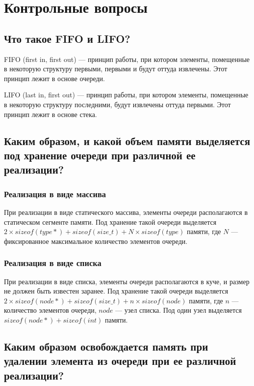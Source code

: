 \documentclass[a4paper,12pt]{extarticle}
\begin{document}
\newpage


\section{Контрольные вопросы}
\subsection{Что такое FIFO и LIFO?}

FIFO (first in, first out) --- принцип работы, при котором элементы, помещенные в некоторую структуру первыми, первыми и будут оттуда извлечены. Этот принцип лежит в основе очереди.

LIFO (last in, first out) --- принцип работы, при котором элементы, помещенные в некоторую структуру последними, будут извлечены оттуда первыми. Этот принцип лежит в основе стека.

\subsection{Каким образом, и какой объем памяти выделяется под хранение очереди при различной ее реализации?}

\subsubsection{Реализация в виде массива}
При реализации в виде статического массива, элементы очереди располагаются в статическом сегменте памяти. Под хранение такой очереди выделяется $2 \times sizeof(type *) + sizeof(size\_t) + N \times sizeof(type)$ памяти, где $N$ --- фиксированное максимальное количество элементов очереди.

\subsubsection{Реализация в виде списка}
При реализации в виде списка, элементы очереди располагаются в куче, и размер не должен быть известен заранее. Под хранение такой очереди выделяется $2 \times sizeof(node *) + sizeof(size\_t) + n \times sizeof(node)$ памяти, где $n$ --- количество элементов очереди, $node$ --- узел списка. Под один узел выделяется $sizeof(node *) + sizeof(int)$ памяти.

\subsection{Каким образом освобождается память при удалении элемента из очереди при ее различной реализации?}
\end{document}
